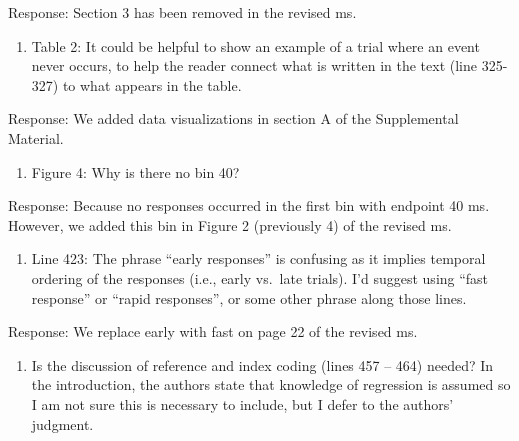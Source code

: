 \documentclass[
]{article}
\providecommand{\tightlist}{%
  \setlength{\itemsep}{0pt}\setlength{\parskip}{0pt}}
\renewenvironment{quote}{\begin{leftbar}}{\end{leftbar}}
\begin{document}
Response: Section 3 has been removed in the revised ms.

\begin{quote}
\begin{enumerate}
\def\labelenumi{\arabic{enumi}.}
\setcounter{enumi}{7}
\tightlist
\item
  Table 2: It could be helpful to show an example of a trial where an
  event never occurs, to help the reader connect what is written in the
  text (line 325-327) to what appears in the table.
\end{enumerate}
\end{quote}

Response: We added data visualizations in section A of the Supplemental
Material.

\begin{quote}
\begin{enumerate}
\def\labelenumi{\arabic{enumi}.}
\setcounter{enumi}{8}
\tightlist
\item
  Figure 4: Why is there no bin 40?
\end{enumerate}
\end{quote}

Response: Because no responses occurred in the first bin with endpoint
40 ms. However, we added this bin in Figure 2 (previously 4) of the
revised ms.

\begin{quote}
\begin{enumerate}
\def\labelenumi{\arabic{enumi}.}
\setcounter{enumi}{9}
\tightlist
\item
  Line 423: The phrase ``early responses'' is confusing as it implies
  temporal ordering of the responses (i.e., early vs.~late trials). I'd
  suggest using ``fast response'' or ``rapid responses'', or some other
  phrase along those lines.
\end{enumerate}
\end{quote}

Response: We replace early with fast on page 22 of the revised ms.

\begin{quote}
\begin{enumerate}
\def\labelenumi{\arabic{enumi}.}
\setcounter{enumi}{10}
\tightlist
\item
  Is the discussion of reference and index coding (lines 457 -- 464)
  needed? In the introduction, the authors state that knowledge of
  regression is assumed so I am not sure this is necessary to include,
  but I defer to the authors' judgment.
\end{enumerate}
\end{quote}
\end{document}
